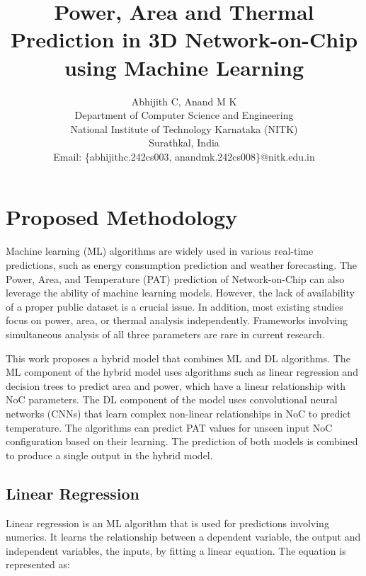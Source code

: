 \documentclass[conference]{IEEEtran}
\begin{document}
\title{Power, Area and Thermal Prediction in 3D Network-on-Chip using Machine Learning}

\author{Abhijith C, Anand M K \\

Department of Computer Science and Engineering \\ 
	National Institute of Technology Karnataka (NITK) \\ 
	Surathkal, India\\
Email: \{abhijithc.242cs003, anandmk.242cs008\}@nitk.edu.in}


\maketitle

\section{Proposed Methodology}

Machine learning (ML) algorithms are widely used in various real-time predictions, such as energy consumption prediction and weather forecasting. The Power, Area, and Temperature (PAT) prediction of Network-on-Chip can also leverage the ability of machine learning models. However, the lack of availability of a proper public dataset is a crucial issue. In addition, most existing studies focus on power, area, or thermal analysis independently. Frameworks involving simultaneous analysis of all three parameters are rare in current research.

This work proposes a hybrid model that combines ML and DL algorithms. The ML component of the hybrid model uses algorithms such as linear regression and decision trees to predict area and power, which have a linear relationship with NoC parameters. The DL component of the model uses convolutional neural networks (CNNs) that learn complex non-linear relationships in NoC to predict temperature. The algorithms can predict PAT values for unseen input NoC configuration based on their learning. The prediction of both models is combined to produce a single output in the hybrid model.

\subsection{Linear Regression}

Linear regression is an ML algorithm that is used for predictions involving numerics. It learns the relationship between a dependent variable, the output and independent variables, the inputs, by fitting a linear equation. The equation is represented as:
\end{document}
